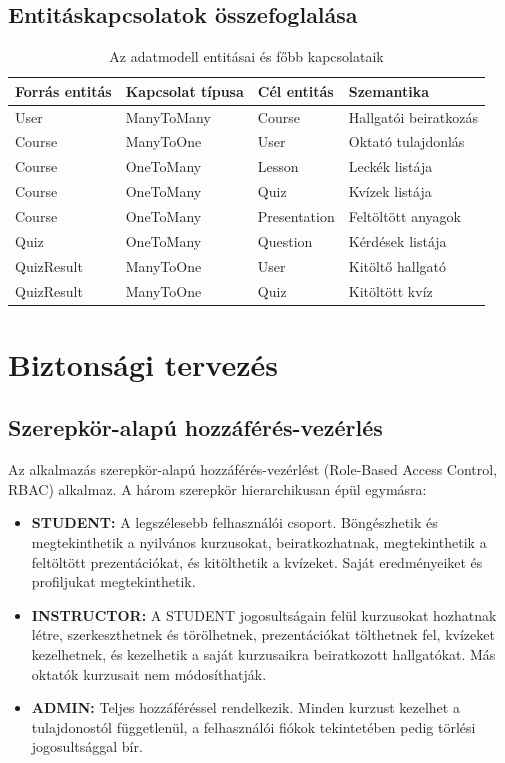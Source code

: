 \subsection{Entitáskapcsolatok összefoglalása}

\begin{table}[h]
\centering
\caption{Az adatmodell entitásai és főbb kapcsolataik}
\label{tab:entities}
\begin{tabular}{|l|l|l|l|}
\hline
\textbf{Forrás entitás} & \textbf{Kapcsolat típusa} & \textbf{Cél entitás} & \textbf{Szemantika} \\
\hline
User & ManyToMany & Course & Hallgatói beiratkozás \\
Course & ManyToOne & User & Oktató tulajdonlás \\
Course & OneToMany & Lesson & Leckék listája \\
Course & OneToMany & Quiz & Kvízek listája \\
Course & OneToMany & Presentation & Feltöltött anyagok \\
Quiz & OneToMany & Question & Kérdések listája \\
QuizResult & ManyToOne & User & Kitöltő hallgató \\
QuizResult & ManyToOne & Quiz & Kitöltött kvíz \\
\hline
\end{tabular}
\end{table}

\section{Biztonsági tervezés}

\subsection{Szerepkör-alapú hozzáférés-vezérlés}

Az alkalmazás szerepkör-alapú hozzáférés-vezérlést (Role-Based Access Control, RBAC) alkalmaz. A három szerepkör hierarchikusan épül egymásra:

\begin{itemize}
    \item \textbf{STUDENT:} A legszélesebb felhasználói csoport. Böngészhetik és megtekinthetik a nyilvános kurzusokat, beiratkozhatnak, megtekinthetik a feltöltött prezentációkat, és kitölthetik a kvízeket. Saját eredményeiket és profiljukat megtekinthetik.
    \item \textbf{INSTRUCTOR:} A STUDENT jogosultságain felül kurzusokat hozhatnak létre, szerkeszthetnek és törölhetnek, prezentációkat tölthetnek fel, kvízeket kezelhetnek, és kezelhetik a saját kurzusaikra beiratkozott hallgatókat. Más oktatók kurzusait nem módosíthatják.
    \item \textbf{ADMIN:} Teljes hozzáféréssel rendelkezik. Minden kurzust kezelhet a tulajdonostól függetlenül, a felhasználói fiókok tekintetében pedig törlési jogosultsággal bír.
\end{itemize}


